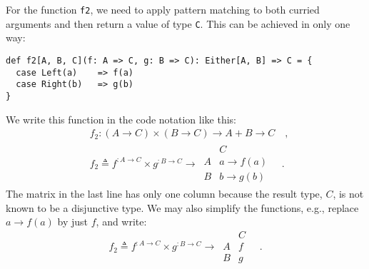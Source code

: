 For the function \lstinline!f2!, we need to apply pattern matching
to both curried arguments and then return a value of type \lstinline!C!.
This can be achieved in only one way:
\begin{lstlisting}
def f2[A, B, C](f: A => C, g: B => C): Either[A, B] => C = {
  case Left(a)    => f(a)
  case Right(b)   => g(b)
}
\end{lstlisting}
We write this function in the code notation like this:
\begin{align*}
 & f_{2}:\left(A\rightarrow C\right)\times\left(B\rightarrow C\right)\rightarrow A+B\rightarrow C\quad,\\
 & f_{2}\triangleq f^{:A\rightarrow C}\times g^{:B\rightarrow C}\rightarrow\,\begin{array}{|c||c|}
 & C\\
\hline A & a\rightarrow f(a)\\
B & b\rightarrow g(b)
\end{array}\quad.
\end{align*}
The matrix in the last line has only one column because the result
type, $C$, is not known to be a disjunctive type. We may also simplify
the functions, e.g., replace $a\rightarrow f(a)$ by just $f$, and
write:
\[
f_{2}\triangleq f^{:A\rightarrow C}\times g^{:B\rightarrow C}\rightarrow\,\begin{array}{|c||c|}
 & C\\
\hline A & f\\
B & g
\end{array}\quad.
\]

